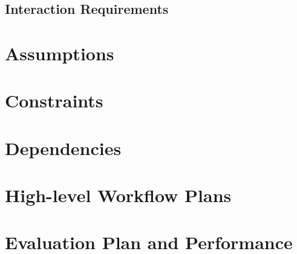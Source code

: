 \documentclass[11pt, oneside]{article}
\begin{document}
\subsection{Interaction Requirements}
\section{Assumptions}
\section{Constraints}
\section{Dependencies}
\section{High-level Workflow Plans}
\section{Evaluation Plan and Performance}
\end{document}
